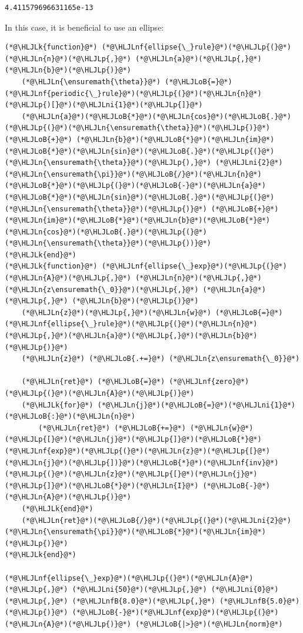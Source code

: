 \documentclass[12pt,a4paper]{article}
\newcommand{\HLJLk}[1]{\textcolor[RGB]{148,91,176}{\textbf{#1}}}
\newcommand{\HLJLn}[1]{#1}
\newcommand{\HLJLnf}[1]{\textcolor[RGB]{66,102,213}{#1}}
\newcommand{\HLJLnfB}[1]{\textcolor[RGB]{59,151,46}{#1}}
\newcommand{\HLJLni}[1]{\textcolor[RGB]{59,151,46}{#1}}
\newcommand{\HLJLoB}[1]{\textcolor[RGB]{102,102,102}{\textbf{#1}}}
\newcommand{\HLJLp}[1]{#1}
\begin{document}
\begin{lstlisting}
4.411579696631165e-13
\end{lstlisting}


In this case, it is beneficial to use an ellipse:


\begin{lstlisting}
(*@\HLJLk{function}@*) (*@\HLJLnf{ellipse{\_}rule}@*)(*@\HLJLp{(}@*)(*@\HLJLn{n}@*)(*@\HLJLp{,}@*) (*@\HLJLn{a}@*)(*@\HLJLp{,}@*) (*@\HLJLn{b}@*)(*@\HLJLp{)}@*) 
    (*@\HLJLn{\ensuremath{\theta}}@*) (*@\HLJLoB{=}@*) (*@\HLJLnf{periodic{\_}rule}@*)(*@\HLJLp{(}@*)(*@\HLJLn{n}@*)(*@\HLJLp{)[}@*)(*@\HLJLni{1}@*)(*@\HLJLp{]}@*)
    (*@\HLJLn{a}@*)(*@\HLJLoB{*}@*)(*@\HLJLn{cos}@*)(*@\HLJLoB{.}@*)(*@\HLJLp{(}@*)(*@\HLJLn{\ensuremath{\theta}}@*)(*@\HLJLp{)}@*) (*@\HLJLoB{+}@*) (*@\HLJLn{b}@*)(*@\HLJLoB{*}@*)(*@\HLJLn{im}@*)(*@\HLJLoB{*}@*)(*@\HLJLn{sin}@*)(*@\HLJLoB{.}@*)(*@\HLJLp{(}@*)(*@\HLJLn{\ensuremath{\theta}}@*)(*@\HLJLp{),}@*) (*@\HLJLni{2}@*)(*@\HLJLn{\ensuremath{\pi}}@*)(*@\HLJLoB{/}@*)(*@\HLJLn{n}@*)(*@\HLJLoB{*}@*)(*@\HLJLp{(}@*)(*@\HLJLoB{-}@*)(*@\HLJLn{a}@*)(*@\HLJLoB{*}@*)(*@\HLJLn{sin}@*)(*@\HLJLoB{.}@*)(*@\HLJLp{(}@*)(*@\HLJLn{\ensuremath{\theta}}@*)(*@\HLJLp{)}@*) (*@\HLJLoB{+}@*) (*@\HLJLn{im}@*)(*@\HLJLoB{*}@*)(*@\HLJLn{b}@*)(*@\HLJLoB{*}@*)(*@\HLJLn{cos}@*)(*@\HLJLoB{.}@*)(*@\HLJLp{(}@*)(*@\HLJLn{\ensuremath{\theta}}@*)(*@\HLJLp{))}@*)
(*@\HLJLk{end}@*)
(*@\HLJLk{function}@*) (*@\HLJLnf{ellipse{\_}exp}@*)(*@\HLJLp{(}@*)(*@\HLJLn{A}@*)(*@\HLJLp{,}@*) (*@\HLJLn{n}@*)(*@\HLJLp{,}@*) (*@\HLJLn{z\ensuremath{\_0}}@*)(*@\HLJLp{,}@*) (*@\HLJLn{a}@*)(*@\HLJLp{,}@*) (*@\HLJLn{b}@*)(*@\HLJLp{)}@*)
    (*@\HLJLn{z}@*)(*@\HLJLp{,}@*)(*@\HLJLn{w}@*) (*@\HLJLoB{=}@*) (*@\HLJLnf{ellipse{\_}rule}@*)(*@\HLJLp{(}@*)(*@\HLJLn{n}@*)(*@\HLJLp{,}@*)(*@\HLJLn{a}@*)(*@\HLJLp{,}@*)(*@\HLJLn{b}@*)(*@\HLJLp{)}@*)
    (*@\HLJLn{z}@*) (*@\HLJLoB{.+=}@*) (*@\HLJLn{z\ensuremath{\_0}}@*)

    (*@\HLJLn{ret}@*) (*@\HLJLoB{=}@*) (*@\HLJLnf{zero}@*)(*@\HLJLp{(}@*)(*@\HLJLn{A}@*)(*@\HLJLp{)}@*)
    (*@\HLJLk{for}@*) (*@\HLJLn{j}@*)(*@\HLJLoB{=}@*)(*@\HLJLni{1}@*)(*@\HLJLoB{:}@*)(*@\HLJLn{n}@*)
        (*@\HLJLn{ret}@*) (*@\HLJLoB{+=}@*) (*@\HLJLn{w}@*)(*@\HLJLp{[}@*)(*@\HLJLn{j}@*)(*@\HLJLp{]}@*)(*@\HLJLoB{*}@*)(*@\HLJLnf{exp}@*)(*@\HLJLp{(}@*)(*@\HLJLn{z}@*)(*@\HLJLp{[}@*)(*@\HLJLn{j}@*)(*@\HLJLp{])}@*)(*@\HLJLoB{*}@*)(*@\HLJLnf{inv}@*)(*@\HLJLp{(}@*)(*@\HLJLn{z}@*)(*@\HLJLp{[}@*)(*@\HLJLn{j}@*)(*@\HLJLp{]}@*)(*@\HLJLoB{*}@*)(*@\HLJLn{I}@*) (*@\HLJLoB{-}@*) (*@\HLJLn{A}@*)(*@\HLJLp{)}@*)
    (*@\HLJLk{end}@*)
    (*@\HLJLn{ret}@*)(*@\HLJLoB{/}@*)(*@\HLJLp{(}@*)(*@\HLJLni{2}@*)(*@\HLJLn{\ensuremath{\pi}}@*)(*@\HLJLoB{*}@*)(*@\HLJLn{im}@*)(*@\HLJLp{)}@*)
(*@\HLJLk{end}@*)

(*@\HLJLnf{ellipse{\_}exp}@*)(*@\HLJLp{(}@*)(*@\HLJLn{A}@*)(*@\HLJLp{,}@*) (*@\HLJLni{50}@*)(*@\HLJLp{,}@*) (*@\HLJLni{0}@*)(*@\HLJLp{,}@*) (*@\HLJLnfB{8.0}@*)(*@\HLJLp{,}@*) (*@\HLJLnfB{5.0}@*)(*@\HLJLp{)}@*) (*@\HLJLoB{-}@*)(*@\HLJLnf{exp}@*)(*@\HLJLp{(}@*)(*@\HLJLn{A}@*)(*@\HLJLp{)}@*) (*@\HLJLoB{|>}@*)(*@\HLJLn{norm}@*)
\end{lstlisting}
\end{document}
